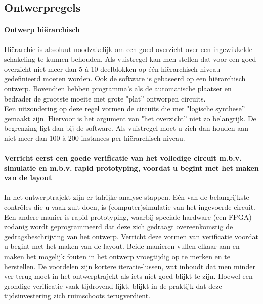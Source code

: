 \subsection{Ontwerpregels}

\paragraph{Ontwerp hi\"erarchisch}
Hi\"erarchie is absoluut noodzakelijk om een goed overzicht over een ingewikkelde schakeling te kunnen behouden. 
Als vuistregel kan men stellen dat voor een goed overzicht niet meer dan 5 \`a 10 deelblokken 
op \'e\'en hi\"erarchisch niveau gedefinieerd moeten worden.
Ook de software is gebaseerd op een hi\"erarchisch ontwerp.
Bovendien hebben programma's als de automatische plaatser en bedrader de grootste moeite met grote "plat'' ontworpen circuits.\\
Een uitzondering op deze regel vormen de circuits die met "logische synthese'' gemaakt zijn.
Hiervoor is het argument van "het overzicht'' niet zo belangrijk. De begrenzing ligt dan bij de software.
Als vuistregel moet u zich dan houden aan niet meer dan 100 \`a 200 instances per hi\"erarchisch niveau.

\paragraph{Verricht eerst een goede verificatie van het volledige circuit m.b.v. simulatie en m.b.v. rapid prototyping,
voordat u begint met het maken van de layout}
In het ont\-werptrajekt zijn er talrijke analyse-stappen.
E\'en van de belangrijkste contr\^oles die u vaak zult doen, is (computer)simulatie van het ingevoerde circuit.
Een andere manier is rapid prototyping, waarbij 
speciale hardware (een FPGA) zodanig wordt geprogrammeerd dat deze zich gedraagt 
overeenkomstig de gedragsbeschrijving van het ontwerp.
Verricht deze vormen van verificatie voordat u begint met het maken van de layout.
Beide manieren vullen elkaar aan en maken het mogelijk fouten in
het ontwerp vroegtijdig op te merken en te herstellen.
De voordelen zijn kortere iteratie-lussen, wat inhoudt dat men minder ver terug moet in het 
ontwerptrajekt als iets niet goed blijkt te zijn. 
Hoewel een grondige verificatie vaak tijdrovend lijkt, 
blijkt in de praktijk dat deze tijdsinvestering zich ruimschoots terugverdient.

